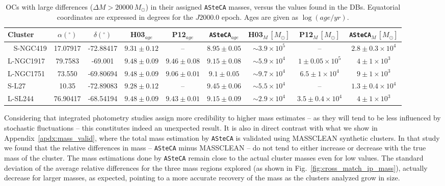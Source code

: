 \documentclass{aa}
\begin{document}
%
\begin{table*}
\centering
\caption{OCs with large differences ($\Delta M{>}20000\,M_{\odot}$) in their
assigned \texttt{ASteCA} masses, versus the values found in the DBs.
Equatorial coordinates are expressed in degrees for the $J2000.0$ epoch.
Ages are given as $\log(age/yr)$.}
\label{tab:integ_phot_masses}
\begin{tabular}{lcccccccc}
\hline\hline
Cluster & $\alpha(^\circ)$ & $\delta(^\circ)$ & H03$_{age}$ &
P12$_{age}$ & \texttt{ASteCA}$_{age}$ &
H03$_{M}\,[M_{\odot}]$ &
P12$_{M}\,[M_{\odot}]$ & \texttt{ASteCA}$_{M}\,[M_{\odot}]$\\
\hline\
%
S-NGC419 & 17.07917 & -72.88417 & $9.31{\pm}0.12$ & -- & $8.95{\pm}0.05$ &
$\sim3.9{\times}10^{5}$ & -- & $2.8{\pm}0.3{\times}10^{4}$\\
%
L-NGC1917 & 79.7583 & -69.001 & $9.48{\pm}0.09$ & $9.46{\pm}0.08$ & $9.15{\pm}0.08$ &
$\sim5.9{\times}10^{4}$ & $1{\pm}0.05{\times}10^{5}$ & $4{\pm}1{\times}10^{3}$\\
%
L-NGC1751 & 73.550 & -69.80694 & $9.48{\pm}0.09$ & $9.06{\pm}0.01$ & $9.1{\pm}0.05$ &
$\sim9.7{\times}10^{4}$ & $6.5{\pm}1{\times}10^{4}$ & $9{\pm}1{\times}10^{3}$\\
%
S-L27 & 10.35 & -72.89083 & $9.28{\pm}0.12$ & -- & $9.45{\pm}0.06$ &
$\sim5.5{\times}10^{4}$ & -- & $1.3{\pm}0.4{\times}10^{4}$\\
%
L-SL244 & 76.90417 & -68.54194 & $9.48{\pm}0.09$ & $9.43{\pm}0.01$ & $9.15{\pm}0.09$ &
$\sim2.9{\times}10^{4}$ & $3.5{\pm}0.4{\times}10^{4}$ & $4{\pm}1{\times}10^{3}$\\
\hline   
\end{tabular}
\end{table*}

Considering that integrated photometry studies assign more credibility to higher
mass estimates -- as they will tend to be less influenced by stochastic
fluctuations -- this constitutes indeed an unexpected result.
%
It is also in direct contrast with what we show in
Appendix~\ref{apdx:mass_valid}, where the total mass estimation by
\texttt{ASteCA} is validated using MASSCLEAN synthetic clusters. In that study
we found that the relative differences in mass -- \texttt{ASteCA} minus
MASSCLEAN -- do not tend to either increase or decrease with the true mass of
the cluster. The mass estimations done by \texttt{ASteCA} remain close to the
actual cluster masses even for low values. The standard deviation of the
average relative differences for the three mass regions explored (as shown in
Fig.~\ref{fig:cross_match_ip_mass}), actually decrease for larger masses, as
expected, pointing to a more accurate recovery of the mass as the clusters
analyzed grow in size.\\
\end{document}
